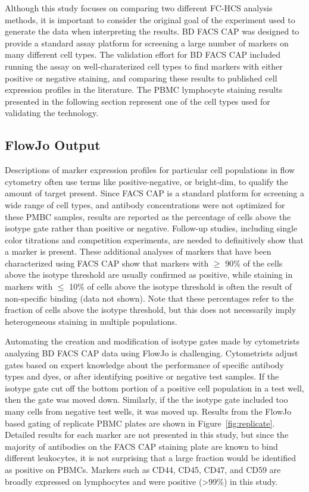 \documentclass[12pt]{article}
\begin{document}
Although this study focuses on comparing two different FC-HCS analysis methods,
it is important to consider the original goal of the experiment used to generate
the data when interpreting the results. BD FACS CAP was designed to provide a
standard assay platform for screening a large number of markers on many
different cell types. The validation effort for BD FACS CAP included running
the assay on well-charaterized cell types to find markers with either positive
or negative staining, and comparing these results to published cell expression
profiles in the literature. The PBMC lymphocyte staining results presented in
the following section represent one of the cell types used for validating the
technology.


\subsection*{FlowJo Output}

Descriptions of marker expression profiles for particular cell populations in
flow cytometry often use terms like positive-negative, or bright-dim, to
qualify the amount of target present. Since FACS CAP is a
standard platform for screening a wide range of cell types, and antibody
concentrations were not optimized for these PMBC samples, results are reported as
the percentage of cells above the isotype gate rather than positive or
negative. Follow-up studies, including single color titrations and competition
experiments, are needed to definitively show that a marker is present.
These additional analyses of markers that have been characterized
using FACS CAP show that markers with $\ge$ 90\% of the cells above the isotype
threshold are usually confirmed as positive, while staining in markers with
$\le$ 10\% of cells above the isotype threshold is often the result of
non-specific binding (data not shown). Note that these percentages refer to the
fraction of cells above the isotype threshold, but this does not necessarily
imply heterogeneous staining in multiple populations.

Automating the creation and modification of isotype gates made by cytometrists
analyzing BD FACS CAP data using FlowJo is challenging. Cytometrists adjust
gates based on expert knowledge about the performance of specific antibody
types and dyes, or after identifying positive or negative test samples. If the
isotype gate cut off the bottom portion of a positive cell population in a test
well, then the gate was moved down.  Similarly, if the the isotype gate
included too many cells from negative test wells, it was moved up. Results from
the FlowJo based gating of replicate PBMC plates are shown in
Figure~\ref{fig:replicate}. Detailed results for each marker are not
presented in this study, but since the majority of antibodies on the FACS
CAP staining plate are known to bind different leukocytes, it is not surprising
that a large fraction would be identified as positive on PBMCs. Markers such as
CD44, CD45, CD47, and CD59 are broadly expressed on lymphocytes and were
positive (>99\%) in this study.
\end{document}
